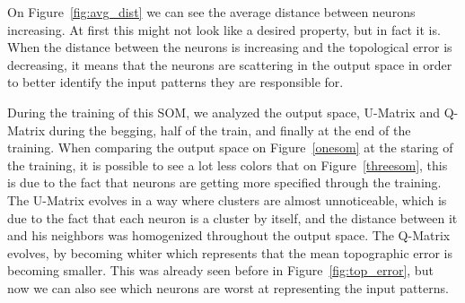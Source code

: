 On Figure~\ref{fig:avg_dist} we can see the average distance between neurons increasing. At first this might not look like a desired property, but in fact it is. When the distance between the neurons is increasing and the topological error is decreasing, it means that the neurons are scattering in the output space in order to better identify the input patterns they are responsible for.

During the training of this \ac{SOM}, we analyzed the output space, \ac{U-Matrix} and \ac{Q-Matrix} during the begging, half of the train, and finally at the end of the training.
When comparing the output space on Figure~\ref{onesom} at the staring of the training, it is possible to see a lot less colors that on Figure~\ref{threesom}, this is due to the fact that neurons are getting more specified through the training. 
The \ac{U-Matrix} evolves in a way where clusters are almost unnoticeable, which is due to the fact that each neuron is a cluster by itself, and the distance between it and his neighbors was homogenized throughout the output space. 
The \ac{Q-Matrix} evolves, by becoming whiter which represents that the mean topographic error is becoming smaller. This was already seen before in Figure~\ref{fig:top_error}, but now we can also see which neurons are worst at representing the input patterns.  

